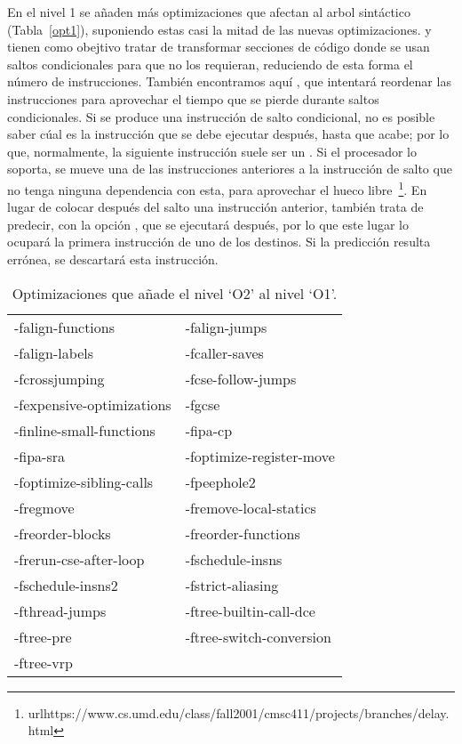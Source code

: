 En el nivel 1 se añaden más optimizaciones que afectan al arbol sintáctico (Tabla~\ref{opt1}), suponiendo estas casi la mitad de las nuevas optimizaciones.  y  tienen como obejtivo tratar de transformar secciones de código donde se usan saltos condicionales para que no los requieran, reduciendo de esta forma el número de instrucciones. También encontramos aquí , que intentará reordenar las instrucciones para aprovechar el tiempo que se pierde durante saltos condicionales. Si se produce una instrucción de salto condicional, no es posible saber cúal es la instrucción que se debe ejecutar después, hasta que acabe; por lo que, normalmente, la siguiente instrucción suele ser un . Si el procesador lo soporta, se mueve una de las instrucciones anteriores a la instrucción de salto que no tenga ninguna dependencia con esta, para aprovechar el hueco libre~\footnote{url{https://www.cs.umd.edu/class/fall2001/cmsc411/projects/branches/delay.html}}. En lugar de colocar después del salto una instrucción anterior,  también trata de predecir, con la opción , que se ejecutará después, por lo que este lugar lo ocupará la primera instrucción de uno de los destinos. Si la predicción resulta errónea, se descartará esta instrucción.

\begin{table}[htb]
\begin{center}
	\begin{tabular}{ll}
		-falign-functions & -falign-jumps\\
		-falign-labels & -fcaller-saves\\
		-fcrossjumping & -fcse-follow-jumps\\
		-fexpensive-optimizations & -fgcse\\
		-finline-small-functions & -fipa-cp\\
		-fipa-sra & -foptimize-register-move\\
		-foptimize-sibling-calls & -fpeephole2\\
		-fregmove & -fremove-local-statics\\
		-freorder-blocks & -freorder-functions\\
		-frerun-cse-after-loop & -fschedule-insns\\
		-fschedule-insns2 & -fstrict-aliasing\\
		-fthread-jumps & -ftree-builtin-call-dce\\
		-ftree-pre & -ftree-switch-conversion\\
		-ftree-vrp & \\
	\end{tabular}
\end{center}
\caption{Optimizaciones que añade el nivel `O2' al nivel `O1'.}
\label{opt2}
\end{table}

